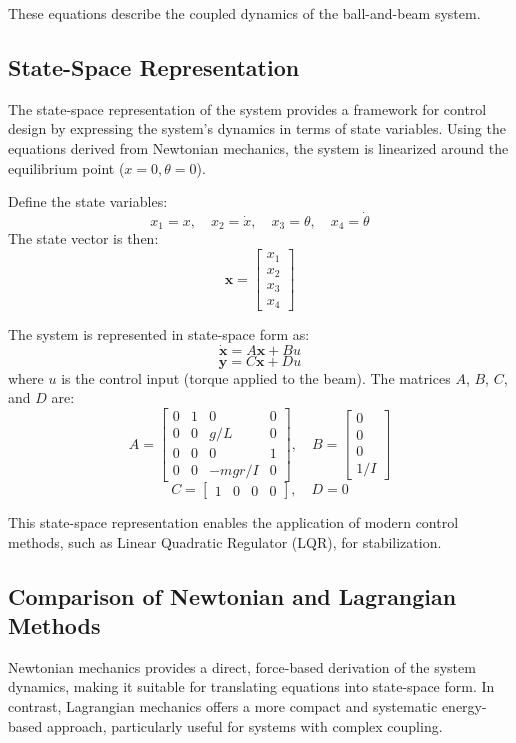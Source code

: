 \documentclass[conference]{IEEEtran}
\begin{document}
These equations describe the coupled dynamics of the ball-and-beam system.

\subsection{State-Space Representation}
\label{subsec:model_ss}
The state-space representation of the system provides a framework for control design by expressing the system's dynamics in terms of state variables. Using the equations derived from Newtonian mechanics, the system is linearized around the equilibrium point (\(x = 0, \theta = 0\)).

Define the state variables:
\[
x_1 = x, \quad x_2 = \dot{x}, \quad x_3 = \theta, \quad x_4 = \dot{\theta}
\]
The state vector is then:
\[
\mathbf{x} = \begin{bmatrix} x_1 \\ x_2 \\ x_3 \\ x_4 \end{bmatrix}
\]

The system is represented in state-space form as:
\begin{equation}
\dot{\mathbf{x}} = A \mathbf{x} + B u
\end{equation}
\begin{equation}
\mathbf{y} = C \mathbf{x} + D u
\end{equation}
where \(u\) is the control input (torque applied to the beam). The matrices \(A\), \(B\), \(C\), and \(D\) are:
\[
A = \begin{bmatrix}
0 & 1 & 0 & 0 \\
0 & 0 & g/L & 0 \\
0 & 0 & 0 & 1 \\
0 & 0 & -m g r/I & 0
\end{bmatrix}, \quad
B = \begin{bmatrix}
0 \\ 0 \\ 0 \\ 1/I
\end{bmatrix}
\]
\[
C = \begin{bmatrix}
1 & 0 & 0 & 0
\end{bmatrix}, \quad
D = 0
\]

This state-space representation enables the application of modern control methods, such as Linear Quadratic Regulator (LQR), for stabilization.

\subsection{Comparison of Newtonian and Lagrangian Methods}
\label{subsec:model_comparison}
Newtonian mechanics provides a direct, force-based derivation of the system dynamics, making it suitable for translating equations into state-space form. In contrast, Lagrangian mechanics offers a more compact and systematic energy-based approach, particularly useful for systems with complex coupling.
\end{document}

